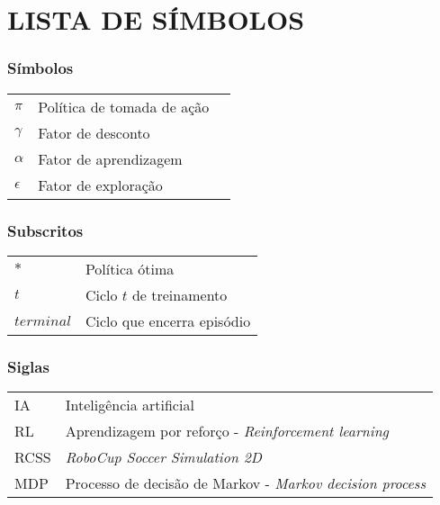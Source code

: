 




\chapter*{LISTA DE SÍMBOLOS}



\subsection*{Símbolos}

\begin{tabular}{p{}p{}>{\PreserveBacklash\raggedleft}p{}}
$\pi$ & Política de tomada de ação \tabularnewline
$\gamma$ & Fator de desconto \tabularnewline
$\alpha$ & Fator de aprendizagem \tabularnewline
$\epsilon$ & Fator de exploração \tabularnewline
\end{tabular}

\subsection*{Subscritos}

\begin{tabular}{p{}p{}}
$*$  & Política ótima \tabularnewline
$t$  & Ciclo $t$ de treinamento \tabularnewline
$terminal$  & Ciclo que encerra episódio \tabularnewline
\end{tabular}


\subsection*{Siglas}

\begin{tabular}{p{}p{}}
IA  & Inteligência artificial\tabularnewline
RL & Aprendizagem por reforço - \textit{Reinforcement learning} \tabularnewline
RCSS & \textit{RoboCup Soccer Simulation 2D}\tabularnewline
MDP & Processo de decisão de Markov - \textit{Markov decision process}\tabularnewline
\end{tabular}
